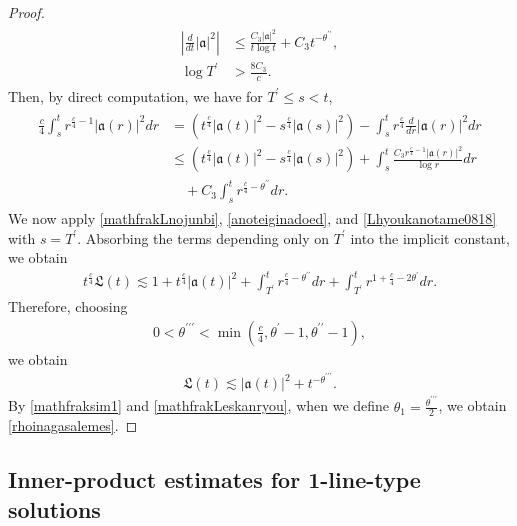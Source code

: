 \documentclass[reqno]{amsart}
\theoremstyle{plain}
\theoremstyle{definition}
\numberwithin{equation}{section}
\begin{document}
\begin{proof}
\begin{align}\label{anoteiginadoed}
\begin{aligned}
\left|\frac{d}{dt}|\mathfrak{a}|^2\right|&\leq \frac{C_3|\mathfrak{a}|^2}{t\log{t}}+C_3t^{-\theta^{\prime \prime}},
\\
\log{T^{\prime}}&>\frac{8C_3}{c}.
\end{aligned}
\end{align}
Then, by direct computation, we have for $T^{\prime}\leq s<t$,
\begin{align}\label{Lhyoukanotame0818}
\begin{aligned}
\frac{c}{4}\int_s^tr^{\frac{c}{4}-1}|\mathfrak{a}(r)|^2dr&=\left(t^{\frac{c}{4}}|\mathfrak{a}(t)|^2-s^{\frac{c}{4}}|\mathfrak{a}(s)|^2\right)-\int_s^tr^{\frac{c}{4}}\frac{d}{dr}|\mathfrak{a}(r)|^2dr
\\
&\leq \left(t^{\frac{c}{4}}|\mathfrak{a}(t)|^2-s^{\frac{c}{4}}|\mathfrak{a}(s)|^2\right)+\int_s^t \frac{C_3r^{\frac{c}{4}-1}|\mathfrak{a}(r)|^2}{\log{r}}dr
\\
&\quad+C_3\int_s^t r^{\frac{c}{4}-\theta^{\prime \prime}}dr.
\end{aligned}
\end{align}
We now apply \eqref{mathfrakLnojunbi}, \eqref{anoteiginadoed}, and \eqref{Lhyoukanotame0818} with $s=T^{\prime}$. Absorbing the terms depending only on $T^{\prime}$ into the implicit constant, we obtain
\begin{align*}
t^{\frac{c}{4}}\mathfrak{L}(t)\lesssim 1+t^{\frac{c}{4}}|\mathfrak{a}(t)|^2+\int_{T^{\prime}}^t r^{\frac{c}{4}-\theta^{\prime\prime}}dr+\int_{T^{\prime}}^t r^{1+\frac{c}{4}-2\theta^{\prime}}dr.
\end{align*}
Therefore, choosing 
\begin{align*}
0<\theta^{\prime\prime\prime}<\min{(\frac{c}{4},\theta^{\prime}-1,\theta^{\prime\prime}-1)},
\end{align*}
we obtain
\begin{align}\label{mathfrakLeskanryou}
\mathfrak{L}(t)\lesssim |\mathfrak{a}(t)|^2+t^{-\theta^{\prime \prime \prime}}.
\end{align}
By \eqref{mathfraksim1} and \eqref{mathfrakLeskanryou}, when we define $\theta_1=\frac{\theta^{\prime \prime \prime}}{2}$, we obtain \eqref{rhoinagasalemes}.
\end{proof}




\subsection{Inner-product estimates for 1-line-type solutions}
\end{document}
